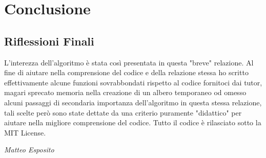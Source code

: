 \chapter{Conclusione}
\section{Riflessioni Finali}
L'interezza dell'algoritmo è stata così presentata in questa "breve" relazione. Al fine di aiutare nella comprensione del codice e della relazione stessa ho scritto effettivamente alcune funzioni sovrabbondati rispetto al codice fornitoci dai tutor, magari sprecato memoria nella creazione di un albero temporaneo od omesso alcuni passaggi di secondaria importanza dell'algoritmo in questa stessa relazione, tali scelte però sono state dettate da una criterio puramente "didattico" per aiutare nella migliore comprensione del codice.
Tutto il codice è rilasciato sotto la MIT License. 
\begin{flushright}
	\emph{Matteo Esposito}
\end{flushright}